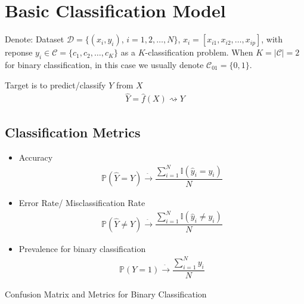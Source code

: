         
    
    
\section{Basic Classification Model}\label{SubSectionBasicClassificationModel}
    Denote: Dataset $\mathcal{D}=\{ (x_i,y_i) $, $ i=1,2,\ldots,N \}$, $ x_i=[x_{i1},x_{i2},\ldots,x_{ip}] $, with reponse $ y_i\in\mathcal{C}=\{c_1,c_2,\ldots ,c_K\} $ as a $ K $-classification problem. When $ K=|\mathcal{C}|=2 $ for binary classification, in this case we usually denote $ \mathcal{C}_{01}=\{0,1\}$.

    Target is to predict/classify $ Y $ from $ X $
    \begin{align}
        \hat{Y}=\hat{f}(X)\rightsquigarrow Y
    \end{align}
    
\subsection{Classification Metrics}

\begin{itemize}[topsep=2pt,itemsep=0pt]
    \item Accuracy
    \begin{align}
        \mathbb{P}\left( \hat{Y}=Y \right) \xrightarrow[]{\hat{ }} \dfrac{\sum_{i=1}^N\mathbb{I}(\hat{y}_i=y_i)}{N}  
    \end{align}
    \item Error Rate/ Misclassification Rate
    \begin{align}
        \mathbb{P}\left( \hat{Y}\neq Y \right) \xrightarrow[]{\hat{ }} \dfrac{\sum_{i=1}^N\mathbb{I}(\hat{y}_i\neq y_i)}{N}  
    \end{align}
    \item Prevalence for binary classification
    \begin{align}
        \mathbb{P}\left( Y=1 \right)  \xrightarrow[]{\hat{ }} \dfrac{\sum_{i=1}^N y_i}{N}
    \end{align}
    
\end{itemize}

\begin{point}
    Confusion Matrix and Metrics for Binary Classification
\end{point}

